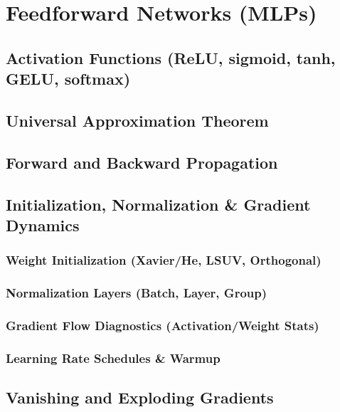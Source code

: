 ﻿\chapter{Feedforward Networks (MLPs)}
\section{Activation Functions (ReLU, sigmoid, tanh, GELU, softmax)}
\section{Universal Approximation Theorem}
\section{Forward and Backward Propagation}
\section{Initialization, Normalization \& Gradient Dynamics}
  \subsection{Weight Initialization (Xavier/He, LSUV, Orthogonal)}
  \subsection{Normalization Layers (Batch, Layer, Group)}
  \subsection{Gradient Flow Diagnostics (Activation/Weight Stats)}
  \subsection{Learning Rate Schedules \& Warmup}
\section{Vanishing and Exploding Gradients}


